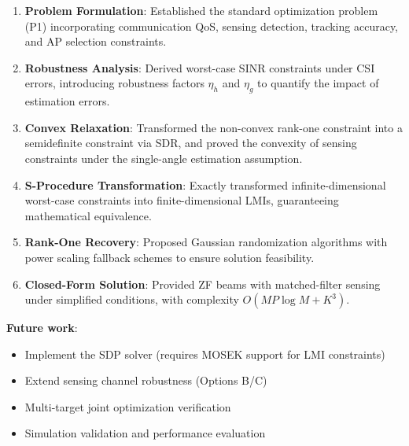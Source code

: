 \documentclass[12pt,a4paper]{article}
\begin{document}
\begin{enumerate}
    \item \textbf{Problem Formulation}: Established the standard optimization problem (P1) incorporating communication QoS, sensing detection, tracking accuracy, and AP selection constraints.
    \item \textbf{Robustness Analysis}: Derived worst-case SINR constraints under CSI errors, introducing robustness factors $\eta_h$ and $\eta_g$ to quantify the impact of estimation errors.
    \item \textbf{Convex Relaxation}: Transformed the non-convex rank-one constraint into a semidefinite constraint via SDR, and proved the convexity of sensing constraints under the single-angle estimation assumption.
    \item \textbf{S-Procedure Transformation}: Exactly transformed infinite-dimensional worst-case constraints into finite-dimensional LMIs, guaranteeing mathematical equivalence.
    \item \textbf{Rank-One Recovery}: Proposed Gaussian randomization algorithms with power scaling fallback schemes to ensure solution feasibility.
    \item \textbf{Closed-Form Solution}: Provided ZF beams with matched-filter sensing under simplified conditions, with complexity $O(MP\log M + K^3)$.
\end{enumerate}

\textbf{Future work}:
\begin{itemize}
    \item Implement the SDP solver (requires MOSEK support for LMI constraints)
    \item Extend sensing channel robustness (Options B/C)
    \item Multi-target joint optimization verification
    \item Simulation validation and performance evaluation
\end{itemize}
\end{document}
